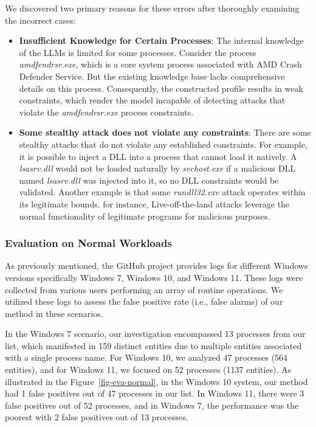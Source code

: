 We discovered two primary reasons for these errors after thoroughly examining the incorrect cases:
\begin{itemize}
    \item \textbf{Insufficient Knowledge for Certain Processes}:  The internal knowledge of the LLMs is limited for some processes. Consider the process \textit{amdfendrsr.exe}, which is a core system process associated with AMD Crash Defender Service. But the existing knowledge base lacks comprehensive details on this process. Consequently, the constructed profile results in weak constraints, which render the model incapable of detecting attacks that violate the \textit{amdfendrsr.exe} process constraints.
    \item \textbf{Some stealthy attack does not violate any constraints}: There are some stealthy attacks that do not violate any established constraints. For example, it is possible to inject a DLL into a process that cannot load it natively. A \textit{lsasrv.dll} would not be loaded naturally by \textit{svchost.exe} if a malicious DLL named \textit{lsasrv.dll} was injected into it, so no DLL constraints would be validated. Another example is that some \textit{rundll32.exe} attack operates within its legitimate bounds. for instance, Live-off-the-land\cite{barr2021survivalism} attacks leverage the normal functionality of legitimate programs for malicious purposes.
\end{itemize}

\subsubsection{Evaluation on Normal Workloads}
As previously mentioned, the GitHub project \cite{evtx-baseline2022} provides logs for different Windows versions specifically Windows 7, Windows 10, and Windows 11. 
These logs were collected from various users performing an array of routine operations. We utilized these logs to assess the false positive rate (i.e., false alarms) of our method in these scenarios.

In the Windows 7 scenario, our investigation encompassed 13 processes from our list, which manifested in 159 distinct entities due to multiple entities associated with a single process name. For Windows 10, we analyzed 47 processes (564 entities), and for Windows 11, we focused on 52 processes (1137 entities).
As illustrated in the Figure~\ref{fig-eva-normal}, in the Windows 10 system, our method had 1 false positives out of 47 processes in our list. In Windows 11, there were 3 false positives out of 52 processes, and in Windows 7, the performance was the poorest with 2 false positives out of 13 processes.

